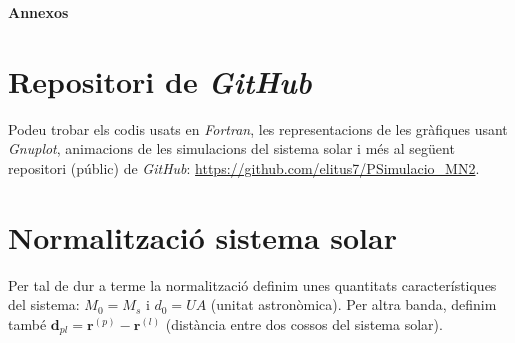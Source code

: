 \documentclass[10pt, twoside, a4paper]{article}
\begin{document}
\newpage
\appendix
{\Huge{\textbf{Annexos}}}
\section{Repositori de \textit{GitHub}}
\label{an:a}
Podeu trobar els codis usats en \textit{Fortran}, les representacions de les gràfiques usant \textit{Gnuplot}, animacions de les simulacions del sistema solar i més al següent repositori (públic) de \textit{GitHub}: \url{https://github.com/elitus7/PSimulacio_MN2}.


\section{Normalització sistema solar}
Per tal de dur a terme la normalització definim unes quantitats característiques del sistema: $M_0 = M_s$ i $d_0 = UA$ (unitat astronòmica). Per altra banda, definim també $\mathbf{d}_{pl} = \mathbf{r}^{(p)}-\mathbf{r}^{(l)}$ (distància entre dos cossos del sistema solar).
\end{document}
